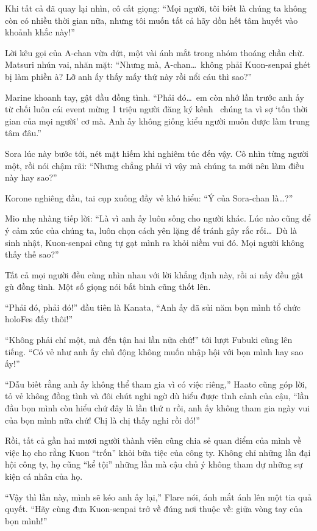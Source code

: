 \documentclass[../main.tex]{subfiles}
\begin{document}
Khi tất cả đã quay lại nhìn, cô cất giọng: ``Mọi người, tôi biết là chúng ta không còn có nhiều thời gian nữa, nhưng tôi muốn tất cả hãy dồn hết tâm huyết vào khoảnh khắc này!''

Lời kêu gọi của A-chan vừa dứt, một vài ánh mắt trong nhóm thoáng chần chừ. Matsuri nhún vai, nhăn mặt: ``Nhưng mà, A-chan\dots\ không phải Kuon-senpai ghét bị làm phiền à? Lỡ anh ấy thấy mấy thứ này rồi nổi cáu thì sao?''

Marine khoanh tay, gật đầu đồng tình. ``Phải đó\dots\ em còn nhớ lần trước anh ấy từ chối luôn cái event mừng 1 triệu người đăng ký kênh \hll\ chúng ta vì sợ  `tốn thời gian của mọi người' cơ mà. Anh ấy không giống kiểu người muốn được làm trung tâm đâu.''

Sora lúc này bước tới, nét mặt hiếm khi nghiêm túc đến vậy. Cô nhìn từng người một, rồi nói chậm rãi: ``Nhưng chẳng phải vì vậy mà chúng ta mới nên làm điều này hay sao?''

Korone nghiêng đầu, tai cụp xuống đầy vẻ khó hiểu: ``Ý của Sora-chan là\dots?''

Mio nhẹ nhàng tiếp lời: ``Là vì anh ấy luôn sống cho người khác. Lúc nào cũng để ý cảm xúc của chúng ta, luôn chọn cách yên lặng để tránh gây rắc rối\dots\ Dù là sinh nhật, Kuon-senpai cũng tự gạt mình ra khỏi niềm vui đó. Mọi người không thấy thế sao?''

Tất cả mọi người đều cùng nhìn nhau với lời khẳng định này, rồi ai nấy đều gật gù đồng tình. Một số giọng nói bất bình cũng thốt lên.

``Phải đó, phải đó!'' đầu tiên là Kanata, ``Anh ấy đã sủi năm bọn mình tổ chức holoFes đấy thôi!''

``Không phải chỉ một, mà đến tận hai lần nữa chứ!'' tới lượt Fubuki cũng lên tiếng. ``Có vẻ như anh ấy chủ động không muốn nhập hội với bọn mình hay sao ấy!''

``Dẫu biết rằng anh ấy không thể tham gia vì có việc riêng,'' Haato cũng góp lời, tỏ vẻ không đồng tình và đôi chút nghi ngờ dù hiểu được tình cảnh của cậu, ``lần đầu bọn mình còn hiểu chứ đây là lần thứ n rồi, anh ấy không tham gia ngày vui của bọn mình nữa chứ! Chị là chị thấy nghi rồi đó!''

Rồi, tất cả gần hai mươi người thành viên cũng chia sẻ quan điểm của mình về việc họ cho rằng Kuon ``trốn'' khỏi bữa tiệc của công ty. Không chỉ những lần đại hội công ty, họ cũng ``kể tội'' những lần mà cậu chủ ý không tham dự những sự kiện cá nhân của họ.

``Vậy thì lần này, mình sẽ kéo anh ấy lại,'' Flare nói, ánh mắt ánh lên một tia quả quyết. ``Hãy cùng đưa Kuon-senpai trở về đúng nơi thuộc về: giữa vòng tay của bọn mình!''
\end{document}
